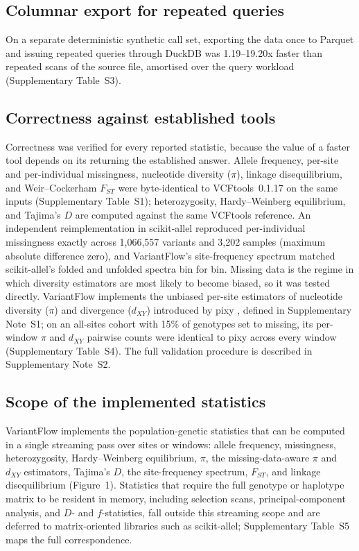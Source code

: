 \subsection{Columnar export for repeated queries}

On a separate deterministic synthetic call set, exporting the data once to
Parquet and issuing repeated queries through DuckDB was 1.19--19.20x faster than
repeated scans of the source file, amortised over the query workload
(Supplementary Table~S3).

\subsection{Correctness against established tools}

Correctness was verified for every reported statistic, because the value of a
faster tool depends on its returning the established answer. Allele frequency,
per-site and per-individual missingness, nucleotide diversity ($\pi$), linkage
disequilibrium, and Weir--Cockerham $F_{ST}$ were byte-identical to
VCFtools~0.1.17 on the same inputs (Supplementary Table~S1); heterozygosity,
Hardy--Weinberg equilibrium, and Tajima's $D$ are computed against the same
VCFtools reference. An independent reimplementation in scikit-allel
\citep{scikitallel} reproduced per-individual missingness exactly across
1,066,557 variants and 3,202 samples (maximum absolute difference zero), and
VariantFlow's site-frequency spectrum matched scikit-allel's folded and unfolded
spectra bin for bin. Missing data is the regime
in which diversity estimators are most likely to become biased, so it was tested
directly. VariantFlow implements the unbiased per-site estimators of nucleotide
diversity ($\pi$) and divergence ($d_{XY}$) introduced by pixy \citep{pixy2021},
defined in Supplementary Note~S1; on an all-sites cohort with 15\% of genotypes
set to missing, its per-window $\pi$ and $d_{XY}$ pairwise counts were identical
to pixy across every window (Supplementary Table~S4). The full validation
procedure is described in Supplementary Note~S2.

\subsection{Scope of the implemented statistics}

VariantFlow implements the population-genetic statistics that can be computed in
a single streaming pass over sites or windows: allele frequency, missingness,
heterozygosity, Hardy--Weinberg equilibrium, $\pi$, the missing-data-aware
$\pi$ and $d_{XY}$ estimators, Tajima's $D$, the site-frequency spectrum,
$F_{ST}$, and linkage disequilibrium (Figure~1). Statistics that require the
full genotype or haplotype
matrix to be resident in memory, including selection scans, principal-component
analysis, and $D$- and $f$-statistics, fall outside this streaming scope and are
deferred to matrix-oriented libraries such as scikit-allel; Supplementary
Table~S5 maps the full correspondence.
